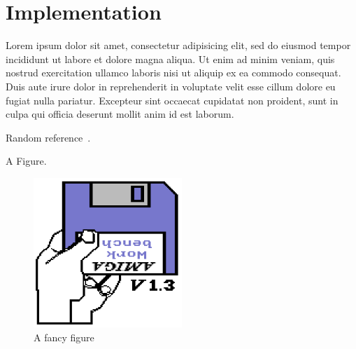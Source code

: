 
\chapter{Implementation}

Lorem ipsum dolor sit amet, consectetur adipisicing elit, sed do eiusmod tempor
incididunt ut labore et dolore magna aliqua. Ut enim ad minim veniam, quis
nostrud exercitation ullamco laboris nisi ut aliquip ex ea commodo
consequat. Duis aute irure dolor in reprehenderit in voluptate velit esse cillum
dolore eu fugiat nulla pariatur. Excepteur sint occaecat cupidatat non proident,
sunt in culpa qui officia deserunt mollit anim id est laborum.

Random reference~\cite{FOO}.

A Figure.
\begin{figure}[ht]
  \centering
  \includegraphics[width=0.5\textwidth]{images/figure.png}
  \caption{A fancy figure}
  \label{img:figureName}
\end{figure}

